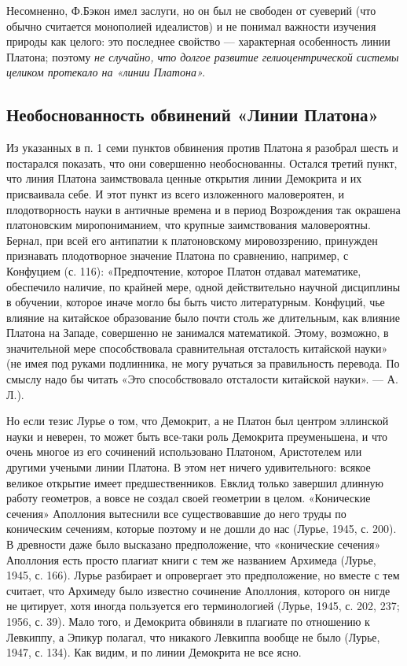 Несомненно, Ф.Бэкон  имел заслуги, но  он был не свободен  от суеверий
(что  обычно считается  монополией идеалистов)  и не  понимал важности
изучения природы  как целого:  это последнее свойство  --- характерная
особенность  линии  Платона;  поэтому \emph{не  случайно,  что  долгое
развитие  гелиоцентрической   системы  целиком  протекало   на  «линии
Платона».}

\subsection{Необоснованность обвинений «Линии Платона»}

Из указанных в  п. 1 семи пунктов обвинения против  Платона я разобрал
шесть  и  постарался  показать,   что  они  совершенно  необоснованны.
Остался третий  пункт, что линия Платона  заимствовала ценные открытия
линии  Демокрита  и  их  присваивала  себе.  И  этот  пункт  из  всего
изложенного маловероятен, и плодотворность  науки в античные времена и
в  период Возрождения  так окрашена  платоновским миропониманием,  что
крупные  заимствования маловероятны.  Бернал, при  всей его  антипатии
к  платоновскому  мировоззрению,   принужден  признавать  плодотворное
значение  Платона  по  сравнению,  например,  с  Конфуцием  (с.  116):
«Предпочтение, которое Платон  отдавал математике, обеспечило наличие,
по крайней  мере, одной  действительно научной дисциплины  в обучении,
которое иначе могло бы быть  чисто литературным. Конфуций, чье влияние
на китайское образование  было почти столь же  длительным, как влияние
Платона  на  Западе,  совершенно   не  занимался  математикой.  Этому,
возможно, в значительной  мере способствовала сравнительная отсталость
китайской науки» (не  имея под руками подлинника, не  могу ручаться за
правильность перевода.  По смыслу  надо бы читать  «Это способствовало
отсталости китайской науки». --- А. Л.).

Но  если тезис  Лурье о  том, что  Демокрит, а  не Платон  был центром
эллинской  науки и  неверен,  то может  быть  все-таки роль  Демокрита
преуменьшена,  и  что  очень  многое  из  его  сочинений  использовано
Платоном, Аристотелем  или другими учеными  линии Платона. В  этом нет
ничего удивительного: всякое  великое открытие имеет предшественников.
Евклид только  завершил длинную  работу геометров,  а вовсе  не создал
своей геометрии в целом.  «Конические сечения» Аполлония вытеснили все
существовавшие до него труды по коническим сечениям, которые поэтому и
не дошли до нас (Лурье, 1945, с. 200). В древности даже было высказано
предположение, что «конические сечения»  Аполлония есть просто плагиат
книги  с  тем же  названием  Архимеда  (Лурье,  1945, с.  166).  Лурье
разбирает и  опровергает это предположение,  но вместе с  тем считает,
что Архимеду было  известно сочинение Аполлония, которого  он нигде не
цитирует, хотя  иногда пользуется  его терминологией (Лурье,  1945, с.
202, 237; 1956, с. 39). Мало  того, и Демокрита обвиняли в плагиате по
отношению к Левкиппу,  а Эпикур полагал, что  никакого Левкиппа вообще
не было (Лурье, 1947, с. 134). Как  видим, и по линии Демокрита не все
ясно.

